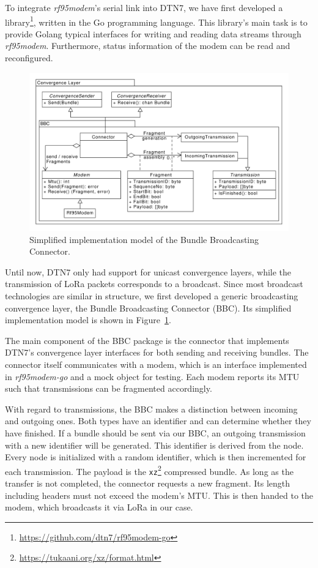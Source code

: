 To integrate \textit{rf95modem}'s serial link into DTN7, we have first developed a  library\footnote{\url{https://github.com/dtn7/rf95modem-go}},  written in the Go programming language.
This library's main task is to provide Golang typical interfaces for writing and reading data streams through \textit{rf95modem}.
Furthermore, status information of the modem can be read and reconfigured.

\begin{figure}[ht!]
    \centering
    \includegraphics[width=1.0\columnwidth]{gfx/dtn7-bbc.pdf}
    \caption{Simplified implementation model of the Bundle Broadcasting Connector.}
    \label{fig:dtn7_bbc_uml}
\end{figure}

Until now, DTN7 only had support for unicast convergence layers, while the transmission of LoRa packets corresponds to a broadcast.
Since most broadcast technologies are similar in structure, we first developed a generic broadcasting convergence layer, the Bundle Broadcasting Connector (BBC).
Its simplified implementation model is shown in Figure~\ref{fig:dtn7_bbc_uml}.

The main component of the BBC package is the connector that implements DTN7's convergence layer interfaces for both sending and receiving bundles.
The connector itself communicates with a modem, which is an interface implemented in \textit{rf95modem-go} and a mock object for testing.
Each modem reports its MTU such that transmissions can be fragmented accordingly.

With regard to transmissions, the BBC makes a distinction between incoming and outgoing ones.
Both types have an identifier and can determine whether they have finished.
If a bundle should be sent via our BBC, an outgoing transmission with a new identifier will be generated.
This identifier is derived from the node.
Every node is initialized with a random identifier, which is then incremented for each transmission.
The payload is the \texttt{xz}\footnote{\url{https://tukaani.org/xz/format.html}} compressed bundle.
As long as the transfer is not completed, the connector requests a new fragment.
Its length including headers must not exceed the modem's MTU.
This is then handed to the modem, which broadcasts it via LoRa in our case.
 
